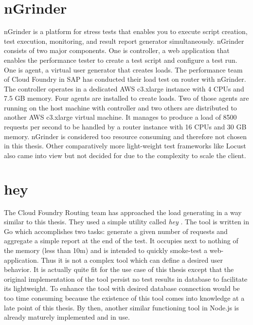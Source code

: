 \section{nGrinder}
nGrinder \citep{NGrinder} is a platform for stress tests that enables you to execute script creation, test execution, monitoring, and result report generator simultaneously. nGrinder consists of two major components. One is  controller, a web application that enables the performance tester to create a test script and configure a test run. One is agent, a virtual user generator that creates loads. 
The performance team of Cloud Foundry in SAP has conducted their load test on router with nGrinder. The controller operates in a dedicated AWS c3.xlarge instance with 4 CPUs and 7.5 GB memory. Four agents are installed to create loads. Two of those agents are running on the host machine with controller and two others are distributed to another AWS c3.xlarge virtual machine. It manages to produce a load of 8500 requests per second to be handled by a router instance with 16 CPUs and 30 GB memory. nGrinder is considered too resource consuming and therefore not chosen in this thesis. Other comparatively more light-weight test frameworks like Locust also came into view but not decided for due to the complexity to scale the client.\\

\section{hey}
The Cloud Foundry Routing team has approached the load generating in a way similar to this thesis. They used a simple utility called \textit{hey} \citep{Hey}. The tool is written in Go which accomplishes two tasks: generate a given number of requests and aggregate a simple report at the end of the test. It occupies next to nothing of the memory (less than 10m) and is intended to quickly smoke-test a web-application. Thus it is not a complex tool which can define a desired user behavior. It is actually quite fit for the use case of this thesis except that the original implementation of the tool persist no test results in database to facilitate its lightweight. To enhance the tool with desired database connection would be too time consuming because the existence of this tool comes into knowledge at a late point of this thesis. By then, another similar functioning tool in Node.js is already maturely implemented and in use.\\    

